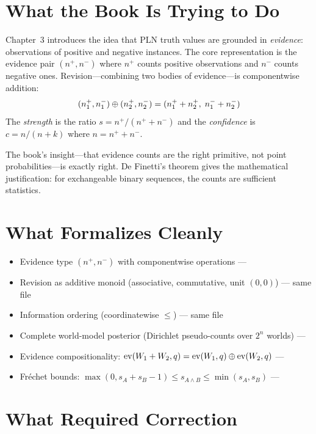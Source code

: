 \documentclass[11pt,openany]{report}
\begin{document}
\section{What the Book Is Trying to Do}

Chapter~3 introduces the idea that PLN truth values are grounded in
\emph{evidence}: observations of positive and negative instances.
The core representation is the evidence pair $(n^+, n^-)$ where
$n^+$ counts positive observations and $n^-$ counts negative ones.
Revision---combining two bodies of evidence---is componentwise addition:
\[
  (n_1^+, n_1^-) \oplus (n_2^+, n_2^-) = (n_1^+ + n_2^+,\; n_1^- + n_2^-)
\]
The \emph{strength} is the ratio $s = n^+ / (n^+ + n^-)$ and the
\emph{confidence} is $c = n / (n + k)$ where $n = n^+ + n^-$.

The book's insight---that evidence counts are the right primitive, not
point probabilities---is exactly right.  De Finetti's theorem gives the
mathematical justification: for exchangeable binary sequences, the counts
are sufficient statistics.

\section{What Formalizes Cleanly}

\begin{itemize}
\item Evidence type $(n^+, n^-)$ with componentwise operations ---
\item Revision as additive monoid (associative, commutative, unit $(0,0)$) ---
  same file
\item Information ordering (coordinatewise $\le$) --- same file
\item Complete world-model posterior (Dirichlet pseudo-counts over $2^n$ worlds) ---
\item Evidence compositionality:
  $\mathrm{ev}(W_1 + W_2, q) = \mathrm{ev}(W_1, q) \oplus \mathrm{ev}(W_2, q)$ ---
\item Fr\'{e}chet bounds: $\max(0, s_A + s_B - 1) \le s_{A \wedge B} \le \min(s_A, s_B)$ ---
\end{itemize}

\section{What Required Correction}
\end{document}
